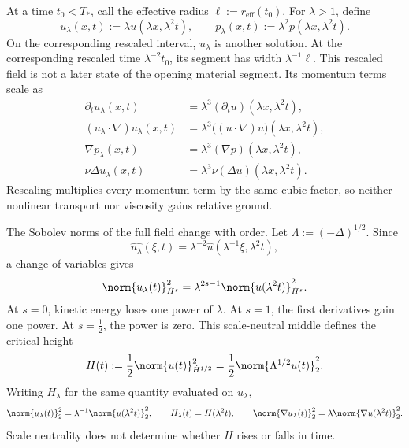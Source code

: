 
At a time \(t_0<T_*\), call the effective radius \(\ell:=r_{\mathrm{eff}}(t_0)\). For \(\lambda>1\), define
\[
  u_\lambda(x,t)
  :=
  \lambda u(\lambda x,\lambda^2t),
  \qquad
  p_\lambda(x,t)
  :=
  \lambda^2p(\lambda x,\lambda^2t).
\]
On the corresponding rescaled interval, \(u_\lambda\) is another \NavierStokes{} solution. At the corresponding rescaled time \(\lambda^{-2}t_0\), its segment has width \(\lambda^{-1}\ell\). This rescaled field is not a later state of the opening material segment. Its momentum terms scale as
\[
\begin{aligned}
  \partial_tu_\lambda(x,t)
  &=
  \lambda^3(\partial_tu)(\lambda x,\lambda^2t),
  \\
  (u_\lambda\cdot\nabla)u_\lambda(x,t)
  &=
  \lambda^3\bigl((u\cdot\nabla)u\bigr)(\lambda x,\lambda^2t),
  \\
  \nabla p_\lambda(x,t)
  &=
  \lambda^3(\nabla p)(\lambda x,\lambda^2t),
  \\
  \nu\Delta u_\lambda(x,t)
  &=
  \lambda^3\nu(\Delta u)(\lambda x,\lambda^2t).
\end{aligned}
\]
Rescaling multiplies every momentum term by the same cubic factor, so neither nonlinear transport nor viscosity gains relative ground.


The Sobolev norms of the full field change with order. Let \(\Lambda:=(-\Delta)^{1/2}\). Since
\[
  \widehat{u_\lambda}(\xi,t)
  =
  \lambda^{-2}\widehat u(\lambda^{-1}\xi,\lambda^2t),
\]
a change of variables gives
\[
  \norm{u_\lambda(t)}_{\dot H^s}^2
  =
  \lambda^{2s-1}
  \norm{u(\lambda^2t)}_{\dot H^s}^2.
\]
At \(s=0\), kinetic energy loses one power of \(\lambda\). At \(s=1\), the first derivatives gain one power. At \(s=\tfrac12\), the power is zero. This scale-neutral middle defines the critical height
\[
  H(t)
  :=
  \frac12\norm{u(t)}_{\dot H^{1/2}}^2
  =
  \frac12\norm{\Lambda^{1/2}u(t)}_2^2.
\]
Writing \(H_\lambda\) for the same quantity evaluated on \(u_\lambda\),
\[
  \norm{u_\lambda(t)}_2^2
  =
  \lambda^{-1}\norm{u(\lambda^2t)}_2^2,
  \qquad
  H_\lambda(t)=H(\lambda^2t),
  \qquad
  \norm{\nabla u_\lambda(t)}_2^2
  =
  \lambda\norm{\nabla u(\lambda^2t)}_2^2.
\]
Scale neutrality does not determine whether \(H\) rises or falls in time.


